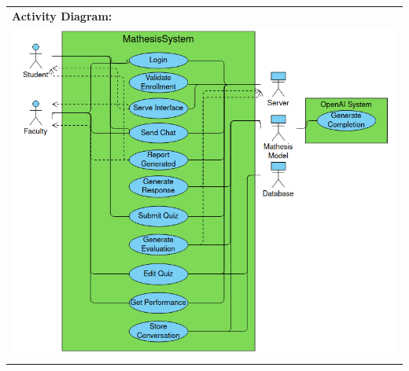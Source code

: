 \documentclass[12pt,a4paper]{article}
\begin{document}
\begin{appendices}
\begin{table}[H]
\begin{tabular}{|p{13cm}|}
        \end{tabular}
        \end{table}

        \begin{table}[H]
        \label{tab:useCaseDoc3}
        \centering
        \def\arraystretch{1.4}
        \begin{tabular}{|p{13cm}|}
            \hline

            \textbf{Activity Diagram:}\\

            \includegraphics[width=\linewidth]{images/newActivityDiagram}\\\hline


\end{tabular}
\end{table}
\end{appendices}
\end{document}
